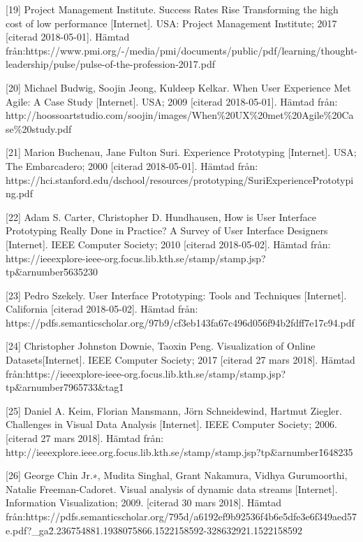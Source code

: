 \documentclass[12pt]{kththesis}
\begin{document}
[19] Project Management Institute. Success Rates Rise Transforming the high cost of low performance [Internet]. USA:  Project Management Institute; 2017 [citerad 2018-05-01]. Hämtad från:\newline https://www.pmi.org/-\newline/media/pmi/documents/public/pdf/learning/thought-leadership/pulse/pulse-of-the-profession-2017.pdf

[20] Michael Budwig, Soojin Jeong, Kuldeep Kelkar. When User Experience Met Agile: A Case Study [Internet]. USA; 2009 [citerad 2018-05-01]. Hämtad från: http://hoossoartstudio.com/soojin/images/When\%\newline20UX\%20met\%20Agile\%20Case\%20study.pdf

[21] Marion Buchenau, Jane Fulton Suri. Experience Prototyping [Internet]. USA; The Embarcadero; 2000 [citerad 2018-05-01]. Hämtad från: https://hci.stanford.edu/dschool/resources/prototyping\newline/SuriExperiencePrototyping.pdf
  
[22] Adam S. Carter, Christopher D. Hundhausen, How is User Interface Prototyping Really Done in Practice? A Survey of User Interface Designers [Internet]. IEEE Computer Society; 2010 [citerad 2018-05-02]. Hämtad från: https://ieeexplore-ieee-org.focus.lib.kth.se/stamp/stamp.jsp?tp\=\&arnumber\newline\=5635230

[23] Pedro Szekely. User Interface Prototyping: Tools and Techniques [Internet]. California [citerad 2018-05-02]. Hämtad från: \newline https://pdfs.semanticscholar.org/97b9\newline/cf3eb143fa67c496d056f94b2fdff7e17c94.pdf  

[24] Christopher Johnston Downie, Taoxin Peng. Visualization of Online Datasets[Internet].  IEEE Computer Society; 2017 [citerad 27 mars 2018]. Hämtad från:\newline https://ieeexplore-ieee-org.focus.lib.kth.se/stamp/stamp.jsp?tp\=\&arnumber\newline\=7965733\&tag\=1

[25] Daniel A. Keim, Florian Mansmann, Jörn Schneidewind, Hartmut Ziegler. Challenges in Visual Data Analysis [Internet]. IEEE Computer Society; 2006. [citerad 27 mars 2018]. Hämtad från:\newline
http://ieeexplore.ieee.org.focus.lib.kth.se/stamp/stamp.jsp?tp\=\&arnumber\newline\=1648235        
   
[26] George Chin Jr.∗, Mudita Singhal, Grant Nakamura, Vidhya Gurumoorthi, Natalie Freeman-Cadoret. Visual analysis of dynamic data streams [Internet]. Information Visualization; 2009. [citerad 30 mars 2018]. Hämtad från:\newline https://pdfs.semanticscholar.org/795d\newline/a6192ef9b92536f4b6e5dfe3e6f349aed57e.pdf?\_ga\newline\=2.236754881.1938075866.1522158592-328632921.1522158592
                   
\end{document}
